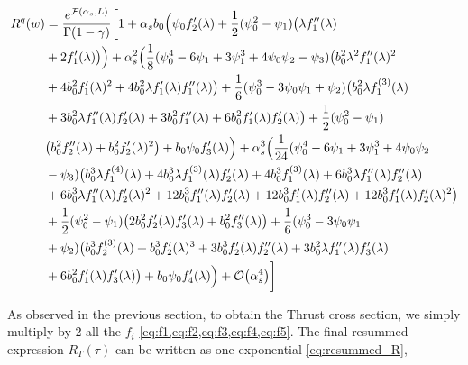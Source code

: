 \documentclass[../main.tex]{subfiles}
\begin{document}
\begin{align}\label{eq:Rw final expansion}
        R^q(w) &= \frac{e^{\mathcal{F}(\alpha_s,L)}}{\Gamma(1-\gamma)} \biggl[ 1 + \alpha_s b_0 \Bigl( \psi_0 f_2'(\lambda )  + \frac{1}{2} (\psi_0^2-\psi_1)\bigl( \lambda  f_1''(\lambda ) \\
        &+2  f_1'(\lambda )\bigr)\Bigr) + \alpha_s^2 \Bigl(\frac{1}{8} (\psi_0^4 -6 \psi_1 + 3\psi_1^3 +4\psi_0\psi_2 -\psi_3) \bigl(b_0^2 \lambda ^2 f_1''(\lambda )^2\nonumber\\
        &+4 b_0^2 f_1'(\lambda )^2 +4 b_0^2 \lambda  f_1'(\lambda ) f_1''(\lambda )\bigr)+\frac{1}{6} (\psi_0^3 -3 \psi_0\psi_1+\psi_2) \bigl(b_0^2 \lambda  f_1^{(3)}(\lambda )\nonumber\\
        &+ 3 b_0^2 \lambda  f_1''(\lambda ) f_2'(\lambda )+3 b_0^2 f_1''(\lambda )+6 b_0^2 f_1'(\lambda ) f_2'(\lambda )\bigr)+\frac{1}{2} (\psi_0^2-\psi_1) \nonumber\\
        &\bigl(b_0^2 f_2''(\lambda ) +b_0^2 f_2'(\lambda )^2\bigr) + b_0 \psi_0 f_3'(\lambda )\Bigr) + \alpha_s^3 \Bigl(\frac{1}{24} (\psi_0^4 -6 \psi_1 + 3\psi_1^3 +4\psi_0\psi_2 \nonumber\\
        &-\psi_3) \bigl(b_0^3 \lambda  f_1^{(4)}(\lambda ) +4 b_0^3 \lambda  f_1^{(3)}(\lambda ) f_2'(\lambda ) + 4 b_0^3 f_1^{(3)}(\lambda )+6 b_0^3 \lambda  f_1''(\lambda ) f_2''(\lambda ) \nonumber\\
        &+ 6 b_0^3 \lambda  f_1''(\lambda ) f_2'(\lambda )^2 +12 b_0^3 f_1''(\lambda ) f_2'(\lambda )+12 b_0^3 f_1'(\lambda ) f_2''(\lambda ) + 12 b_0^3 f_1'(\lambda ) f_2'(\lambda )^2\bigr) \nonumber\\
        &+ \frac{1}{2} (\psi_0^2-\psi_1) \bigl(2 b_0^2 f_2'(\lambda ) f_3'(\lambda )+b_0^2 f_3''(\lambda )\bigr) + \frac{1}{6} (\psi_0^3 -3 \psi_0\psi_1\nonumber\\
        &+\psi_2) \bigl(b_0^3 f_2^{(3)}(\lambda )+b_0^3 f_2'(\lambda )^3 +3 b_0^3 f_2'(\lambda ) f_2''(\lambda )+3 b_0^2 \lambda  f_1''(\lambda ) f_3'(\lambda )\nonumber \\
        &+6 b_0^2 f_1'(\lambda ) f_3'(\lambda )\bigr) + b_0 \psi_0 f_4'(\lambda ) \Bigr) + \order{\alpha_s^4} \biggr]\nonumber
\end{align}

As observed in the previous section, to obtain the Thrust cross section, we simply multiply by 2 all the $f_i$  \cref{eq:f1,eq:f2,eq:f3,eq:f4,eq:f5}. The final resummed expression $R_T(\tau)$ can be written 
as one exponential \cref{eq:resummed_R}, 
\end{document}

